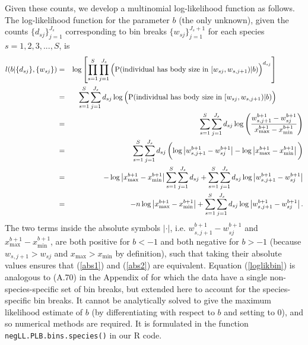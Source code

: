 \documentclass[12pt, letter]{article}
\newcommand{\eb}{\begin{eqnarray}}
\newcommand{\ee}{\end{eqnarray}}
\newcommand{\xmin}{x_{\mathrm{min}}}
\newcommand{\xmax}{x_{\mathrm{max}}}
\newcommand{\MEE}{erpbb17}     %
\begin{document}
Given these counts, we develop a multinomial log-likelihood function
\citep{lawl03} as follows. The log-likelihood function for the parameter $b$
(the only unknown), given the counts $\{ d_{sj} \}_{j=1}^{J_s}$ corresponding to
bin breaks $\{ w_{sj} \}_{j=1}^{J_s +1}$ for each species $s=1, 2, 3, ..., S$,
is
\eb
l(b | \{d_{sj} \}, \{w_{sj} \}) & = & \log \left[ \prod_{s=1}^{S}
  \prod_{j=1}^{J_s} \left( \mbox{P}(\mbox{individual has body size in
  }[w_{sj}, w_{s, j+1}) | b) {\vrule height 12pt width 0pt} \right)^{d_{sj}}
    \right]
~~~~~~~~~~~\label{ll1}\\ %
& = & \sum_{s=1}^{S} \sum_{j=1}^{J_s} d_{sj} \log \left(
  \mbox{P}(\mbox{individual has body size in }[w_{sj}, w_{s, j+1}) | b) {\vrule
      height 12pt width 0pt} \right)
~~~~~~~~~~~\label{ll2}\\
& = & \sum_{s=1}^{S} \sum_{j=1}^{J_s} d_{sj} \log \left( \frac{w_{s, j+1}^{b +
        1} - w_{sj}^{b + 1}}{\xmax^{b + 1} - \xmin^{b + 1}}
    \right)
\label{abs1}\\
& = & \sum_{s=1}^{S} \sum_{j=1}^{J_s} d_{sj} \left(
    \log \left| w_{s, j+1}^{b + 1} - w_{sj}^{b + 1}\right| - \log \left|
    \xmax^{b + 1} - \xmin^{b + 1} \right| {\vrule height 14pt width 0pt}
    \right)
\label{abs2}\\
%
%
& = & - \log \left| \xmax^{b + 1} - \xmin^{b + 1} \right| \sum_{s=1}^{S}
    \sum_{j=1}^{J_s} d_{sj} + \sum_{s=1}^{S} \sum_{j=1}^{J_s} d_{sj} \log
    \left| w_{s, j+1}^{b + 1} - w_{sj}^{b + 1}\right|\\
& = & - n \log \left|
    \xmax^{b + 1} - \xmin^{b + 1} \right| + \sum_{s=1}^{S} \sum_{j=1}^{J_s}
    d_{sj} \log \left| w_{s, j+1}^{b + 1} - w_{sj}^{b +
      1}\right|.
\label{loglikbin}
\ee
%
The two terms inside the absolute symbols $| \cdot |$, i.e. $w_{s, j+1}^{b + 1}
- w_{sj}^{b + 1}$ and $\xmax^{b + 1} - \xmin^{b + 1}$, are both positive for $b
< -1$ and both negative for $b>-1$ (because $w_{s, j+1} > w_{sj}$ and $\xmax >
\xmin$ by definition), such that taking their absolute values ensures that
(\ref{abs1}) and (\ref{abs2}) are equivalent. Equation (\ref{loglikbin}) is
analogous to (A.70) in the Appendix of \citet{\MEE} for which the data have a
single non-species-specific set of bin breaks, but extended here to account for
the species-specific bin breaks. It cannot be analytically solved to give the
maximum likelihood estimate of $b$ (by differentiating with respect to $b$ and
setting to 0), and so numerical methods are required. It is formulated in the
function {\tt negLL.PLB.bins.species()} in our R code.
\end{document}
